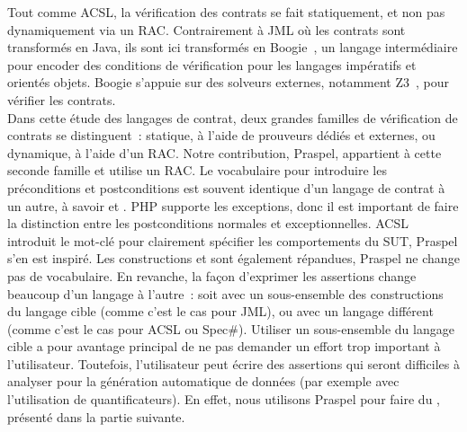 Tout comme ACSL, la vérification des contrats se fait statiquement, et non pas
dynamiquement via un RAC. Contrairement à JML où les contrats sont transformés
en Java, ils sont ici transformés en Boogie~, un langage
intermédiaire pour encoder des conditions de vérification pour les langages
impératifs et orientés objets. Boogie s'appuie sur des solveurs externes,
notamment Z3~, pour vérifier les contrats. \\

Dans cette étude des langages de contrat, deux grandes familles de vérification
de contrats se distinguent~: statique, à l'aide de prouveurs dédiés et externes,
ou dynamique, à l'aide d'un RAC. Notre contribution, Praspel, appartient à cette
seconde famille et utilise un RAC. Le vocabulaire pour introduire les
préconditions et postconditions est souvent identique d'un langage de contrat à
un autre, à savoir  et . PHP supporte les
exceptions, donc il est important de faire la distinction entre les
postconditions normales et exceptionnelles. ACSL introduit le mot-clé
 pour clairement spécifier les comportements du SUT, Praspel s'en
est inspiré. Les constructions \aresult et \aold{\empty} sont également
répandues, Praspel ne change pas de vocabulaire. En revanche, la façon
d'exprimer les assertions change beaucoup d'un langage à l'autre~: soit avec un
sous-ensemble des constructions du langage cible (comme c'est le cas pour JML),
ou avec un langage différent (comme c'est le cas pour ACSL ou Spec\#).  Utiliser
un sous-ensemble du langage cible a pour avantage principal de ne pas demander
un effort trop important à l'utilisateur. Toutefois, l'utilisateur peut écrire
des assertions qui seront difficiles à analyser pour la génération automatique
de données (par exemple avec l'utilisation de quantificateurs). En effet, nous
utilisons Praspel pour faire du , présenté
dans la partie suivante.
